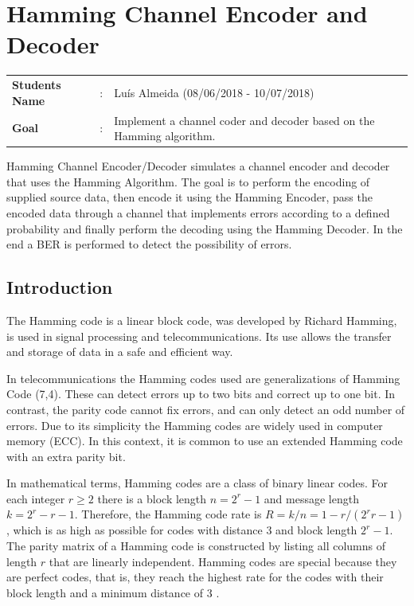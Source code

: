 \clearpage
\section{Hamming Channel Encoder and Decoder }

\begin{refsection}

\begin{tcolorbox}	
	\begin{tabular}{p{2.75cm} p{0.2cm} p{10.5cm}} 	
		\textbf{Students Name} &:& Lu\'{i}s Almeida (08/06/2018 - 10/07/2018) \\
		\textbf{Goal}          &:& Implement a channel coder and decoder based on the Hamming algorithm.
	\end{tabular}
\end{tcolorbox}

Hamming Channel Encoder/Decoder simulates a channel encoder and decoder that uses the Hamming Algorithm. The goal is to perform the encoding of supplied source data, then encode it using the Hamming Encoder, pass the encoded data through a channel that implements errors according to a defined probability and finally perform the decoding using the Hamming Decoder. In the end a BER is performed to detect the possibility of errors.

\subsection{Introduction}

The Hamming code is a linear block code, was developed by Richard Hamming, is used in signal processing and telecommunications. Its use allows the transfer and storage of data in a safe and efficient way.

In telecommunications the Hamming codes used are generalizations of Hamming Code (7,4). These can detect errors up to two bits and correct up to one bit. In contrast, the parity code cannot fix errors, and can only detect an odd number of errors. Due to its simplicity the Hamming codes are widely used in computer memory (ECC). In this context, it is common to use an extended Hamming code with an extra parity bit.

In mathematical terms, Hamming codes are a class of binary linear codes. For each integer $r \geq 2$ there is a block length $n = 2^{r} -1$ and message length $k = 2^{r} - r - 1$. Therefore, the Hamming code rate is $R = k / n = 1 - r / (2^{r}r - 1)$, which is as high as possible for codes with distance $3$ and block length $2^{r} - 1$. The parity matrix of a Hamming code is constructed by listing all columns of length $r$ that are linearly independent. Hamming codes are special because they are perfect codes, that is, they reach the highest rate for the codes with their block length and a minimum distance of $3$ \cite{venkatesanguruswami2010}.


\end{refsection}
